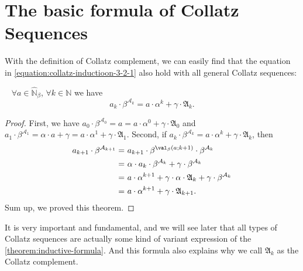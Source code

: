 \section{The basic formula of Collatz Sequences}\label{sec:the-basic-formula-of-collatz-sequences}

With the definition of Collatz complement, we can easily find that the equation in \cref{equation:collatz-inductioon-3-2-1} also hold with all general Collatz sequences:
\begin{theorem}~\label{theorem:inductive-formula}
$\forall a \in \widehat{\mathbb{N}}_{{\beta}}$, $\forall k \in \mathbb{N}$ we have
\[ a_k \cdot \beta^{\mathcal{A}_k} = a \cdot\alpha^k + \gamma\cdot\mathfrak{A}_{k}. \]
\end{theorem}
\begin{proof}
    First, we have $a_0 \cdot \beta^{\mathcal{A}_0} = a = a \cdot \alpha^{0} + \gamma \cdot \mathfrak{A}_0$ and $a_1 \cdot \beta^{\mathcal{A}_1} = \alpha \cdot a + \gamma = a \cdot \alpha^{1} + \gamma \cdot \mathfrak{A}_1$.\newline
    Second, if $a_k \cdot \beta^{\mathcal{A}_k} = a \cdot\alpha^k + \gamma\cdot\mathfrak{A}_{k}$, then
    \begin{align*}
        a_{k+1} \cdot \beta^{\mathcal{A}_{k+1}}
        =&\ a_{k+1} \cdot \beta^{\val_{\beta}(a;k+1)} \cdot \beta^{\mathcal{A}_{k}} \\
        =&\ \alpha \cdot a_k \cdot \beta^{\mathcal{A}_k} + \gamma \cdot \beta^{\mathcal{A}_k} \\
        =&\ a \cdot \alpha^{k+1} + \gamma \cdot \alpha \cdot \mathfrak{A}_{k} + \gamma \cdot \beta^{\mathcal{A}_k} \\
        =&\ a \cdot \alpha^{k+1} + \gamma \cdot \mathfrak{A}_{k+1}.
    \end{align*}
    Sum up, we proved this theorem.
\end{proof}
It is very important and fundamental, and we will see later that all types of Collatz sequences are actually some kind of variant expression of the \cref{theorem:inductive-formula}. And this formula also explains why we call $\mathfrak{A}_k$ as the Collatz complement.
